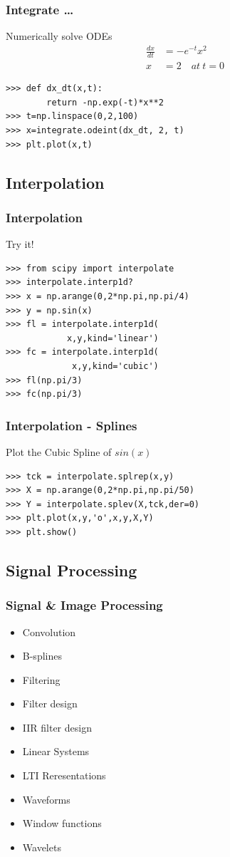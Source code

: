 \documentclass[14pt,compress]{beamer}
\newcounter{time}
\newcommand{\inctime}[1]{\addtocounter{time}{#1}{\tiny \thetime\ m}}
\begin{document}
\begin{frame}[fragile]
  \frametitle{Integrate \ldots}
  Numerically solve ODEs\\
  \begin{align*}
  \frac{dx}{dt}&=-e^{-t}x^2\\ 
           x&=2 \quad at \ t=0
  \end{align*}
  \begin{lstlisting}
>>> def dx_dt(x,t):
        return -np.exp(-t)*x**2
>>> t=np.linspace(0,2,100)
>>> x=integrate.odeint(dx_dt, 2, t)
>>> plt.plot(x,t)
  \end{lstlisting}
\inctime{10}
\end{frame}

\subsection{Interpolation}
\begin{frame}[fragile]
  \frametitle{Interpolation}
  Try it!
  \begin{lstlisting}
>>> from scipy import interpolate
>>> interpolate.interp1d?
>>> x = np.arange(0,2*np.pi,np.pi/4)
>>> y = np.sin(x)
>>> fl = interpolate.interp1d(
            x,y,kind='linear')
>>> fc = interpolate.interp1d(
             x,y,kind='cubic')
>>> fl(np.pi/3)
>>> fc(np.pi/3)
  \end{lstlisting}
\end{frame}

\begin{frame}[fragile]
  \frametitle{Interpolation - Splines}
  Plot the Cubic Spline of $sin(x)$
  \begin{lstlisting}
>>> tck = interpolate.splrep(x,y)
>>> X = np.arange(0,2*np.pi,np.pi/50)
>>> Y = interpolate.splev(X,tck,der=0)
>>> plt.plot(x,y,'o',x,y,X,Y)
>>> plt.show()
  \end{lstlisting}
\inctime{10}
\end{frame}

\subsection{Signal Processing}
\begin{frame}[fragile]
  \frametitle{Signal \& Image Processing}
    \begin{itemize}
     \item Convolution
     \item B-splines
     \item Filtering
     \item Filter design
     \item IIR filter design
     \item Linear Systems
     \item LTI Reresentations
     \item Waveforms
     \item Window functions
     \item Wavelets
    \end{itemize}
\end{frame}
\end{document}
